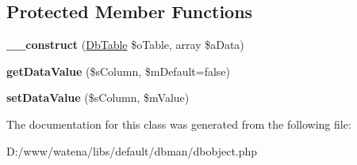 \subsection*{Protected Member Functions}
\begin{DoxyCompactItemize}
\item 
\hypertarget{class_db_object_a3b6f7cbd6365b2b116add281bc24ca40}{{\bfseries \-\_\-\-\_\-construct} (\hyperlink{class_db_table}{Db\-Table} \$o\-Table, array \$a\-Data)}\label{class_db_object_a3b6f7cbd6365b2b116add281bc24ca40}

\item 
\hypertarget{class_db_object_a449264f07a4601bdd23572b8162557c1}{{\bfseries get\-Data\-Value} (\$s\-Column, \$m\-Default=false)}\label{class_db_object_a449264f07a4601bdd23572b8162557c1}

\item 
\hypertarget{class_db_object_a1cf703960ff6db11c765991c7a510bee}{{\bfseries set\-Data\-Value} (\$s\-Column, \$m\-Value)}\label{class_db_object_a1cf703960ff6db11c765991c7a510bee}

\end{DoxyCompactItemize}


The documentation for this class was generated from the following file\-:\begin{DoxyCompactItemize}
\item 
D\-:/www/watena/libs/default/dbman/dbobject.\-php\end{DoxyCompactItemize}
